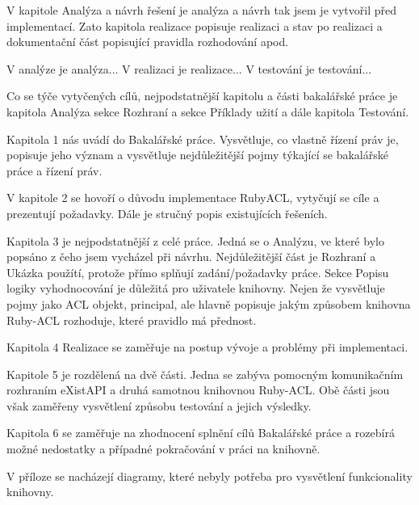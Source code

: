 V kapitole Analýza a návrh řešení je analýza a návrh tak jsem je vytvořil před implementací.
Zato kapitola realizace popisuje realizaci a stav po realizaci a dokumentační část popisující pravidla rozhodování apod.

V analýze je analýza...
V realizaci je realizace...
V testování je testování...

Co se týče vytyčených cílů, nejpodstatnější kapitolu a části bakalářské práce je kapitola Analýza sekce Rozhraní a sekce Příklady užití a dále kapitola Testování.

Kapitola 1 nás uvádí do Bakalářské práce. Vysvětluje, co vlastně řízení práv je, popisuje jeho význam a vysvětluje nejdůležitější pojmy týkající se bakalářské práce a řízení práv.

V kapitole 2 se hovoří o důvodu implementace RubyACL, vytyčují se cíle a prezentují požadavky. Dále je stručný popis existujících řešeních.

Kapitola 3 je nejpodstatnější z celé práce. Jedná se o Analýzu, ve které bylo popsáno z čeho jsem vycházel při návrhu. Nejdůležitější část je Rozhraní a Ukázka použítí, protože přímo splňují zadání/požadavky práce. Sekce Popisu logiky vyhodnocování je důležitá pro uživatele knihovny. Nejen že vysvětluje pojmy jako ACL objekt, principal, ale hlavně popisuje jakým způsobem knihovna Ruby-ACL rozhoduje, které pravidlo má přednost.

Kapitola 4 Realizace se zaměřuje na postup vývoje a problémy při implementaci.

Kapitole 5 je rozdělená na dvě části. Jedna se zabýva pomocným komunikačním rozhraním eXistAPI a druhá samotnou knihovnou Ruby-ACL. Obě části jsou však zaměřeny vysvětlení způsobu testování a jejich výsledky.

Kapitola 6 se zaměřuje na zhodnocení splnění cílů Bakalářské práce a rozebírá možné nedostatky a případné pokračování v práci na knihovně.

V příloze se nacházejí diagramy, které nebyly potřeba pro vysvětlení funkcionality knihovny.

